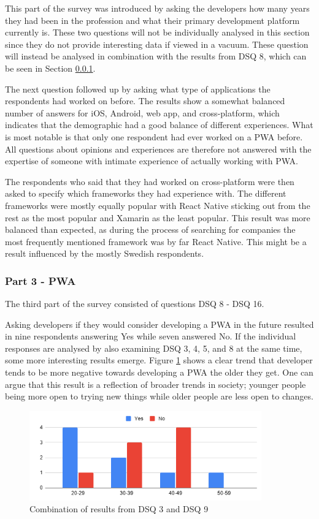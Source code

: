 \documentclass[a4paper,12pt]{article}
\begin{document}
This part of the survey was introduced by asking the developers how many years they had been in the profession and what their primary development platform currently is. These two questions will not be individually analysed in this section since they do not provide interesting data if viewed in a vacuum. These question will instead be analysed in combination with the results from DSQ 8, which can be seen in Section \ref{Analysis_devSurvey_part3}.

The next question followed up by asking what type of applications the respondents had worked on before. The results show a somewhat balanced number of answers for iOS, Android, web app, and cross-platform, which indicates that the demographic had a good balance of different experiences. What is most notable is that only one respondent had ever worked on a PWA before. All questions about opinions and experiences are therefore not answered with the expertise of someone with intimate experience of actually working with PWA.

The respondents who said that they had worked on cross-platform were then asked to specify which frameworks they had experience with. The different frameworks were mostly equally popular with React Native sticking out from the rest as the most popular and Xamarin as the least popular. This result was more balanced than expected, as during the process of searching for companies the most frequently mentioned framework was by far React Native. This might be a result influenced by the mostly Swedish respondents.


\subsubsection{Part 3 - PWA}
\label{Analysis_devSurvey_part3}
The third part of the survey consisted of questions DSQ 8 - DSQ 16.

Asking developers if they would consider developing a PWA in the future resulted in nine respondents answering Yes while seven answered No. If the individual responses are analysed by also examining DSQ 3, 4, 5, and 8 at the same time, some more interesting results emerge.  Figure \ref{fig:analysis_age} shows a clear trend that developer tends to be more negative towards developing a PWA the older they get. One can argue that this result is a reflection of broader trends in society; younger people being more open to trying new things while older people are less open to changes.

\begin{figure}[ht!]
    \centering
    \includegraphics[width=10cm]{img/Analysis/age.png}
    \caption{Combination of results from DSQ 3 and DSQ 9 }
    \label{fig:analysis_age}
\end{figure}
\end{document}
